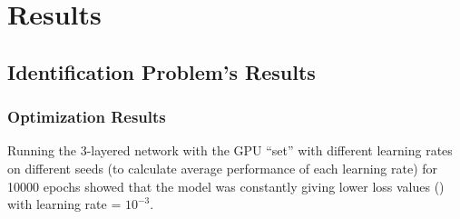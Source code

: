 \chapter{Results} \label{sec:Results}
\section{Identification Problem's Results} \label{sec:Identification Problem's Results}
\subsection{Optimization Results} \label{sec:IdProbRes - Optimization}
Running the 3-layered network with the GPU ``set'' with different learning rates on different seeds (to calculate average performance of each learning rate) for 10000 epochs showed that the model was constantly giving lower loss values () with learning rate = $10^{-3}$. 

